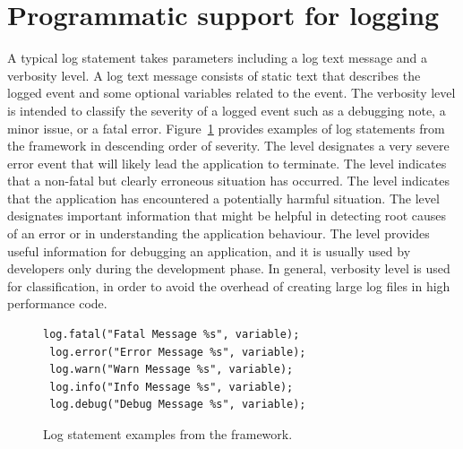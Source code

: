 
\section{Programmatic support for logging} \label{background Logging}

A typical log statement takes parameters including a log text message and a verbosity level. A log text message consists of static text that describes the logged event and some optional variables related to the event. The verbosity level is intended to classify the severity of a logged event such as a debugging note, a minor issue, or a fatal error. Figure~\ref{fig:log-call-examples} provides examples of log statements from the  framework in descending order of severity. The  level designates a very severe error event that will likely lead the application to terminate. The  level indicates that a non-fatal but clearly erroneous situation has occurred. The  level indicates that the application has encountered a potentially harmful situation. The  level designates important information that might be helpful in detecting root causes of an error or in understanding the application behaviour. The  level provides useful information for debugging an application, and it is usually used by developers only during the development phase. In general, verbosity level is used for classification, in order to avoid the overhead of creating large log files in high performance code.

\begin{figure}[H]
\vspace*{1em}
\begin{center}
\begin{minipage}{3.5in}
\begin{lstlisting}[frame=single,numbers=none]
 log.fatal("Fatal Message %s", variable);
 log.error("Error Message %s", variable);
 log.warn("Warn Message %s", variable);
 log.info("Info Message %s", variable);
 log.debug("Debug Message %s", variable);
\end{lstlisting}
\end{minipage}
\caption{Log statement examples from the \protect{} framework.\label{fig:chap1_logCode}\label{fig:log-call-examples}}
\end{center}
\end{figure}

